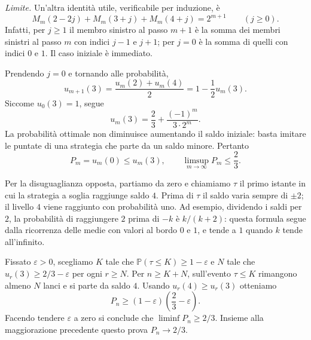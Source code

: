 {\emph{Limite.}
Un'altra identit\`a utile, verificabile per induzione, \`e
\[
 M_m(2-2j)+M_m(3+j)+M_m(4+j)=2^{m+1}
 \qquad(j\geq0).
\]
Infatti, per $j\geq1$ il membro sinistro al passo $m+1$ \`e la somma
dei membri sinistri al passo $m$ con indici $j-1$ e $j+1$;
per $j=0$ \`e la somma di quelli con indici $0$ e $1$.
Il caso iniziale \`e immediato.

Prendendo $j=0$ e tornando alle probabilit\`a,
\[
 u_{m+1}(3)=\frac{u_m(2)+u_m(4)}2
          =1-\frac12u_m(3).
\]
Siccome $u_0(3)=1$, segue
\[
 u_m(3)=\frac23+\frac{(-1)^m}{3\cdot2^m}.
\]
La probabilit\`a ottimale non diminuisce aumentando il saldo iniziale:
basta imitare le puntate di una strategia che parte da un saldo minore.
Pertanto
\[
 P_m=u_m(0)\leq u_m(3),
 \qquad \limsup_{m\to\infty}P_m\leq\frac23.
\]

Per la disuguaglianza opposta, partiamo da zero e chiamiamo $\tau$
il primo istante in cui la strategia a soglia raggiunge saldo $4$.
Prima di $\tau$ il saldo varia sempre di $\pm2$; il livello $4$ viene
raggiunto con probabilit\`a uno. Ad esempio, dividendo i saldi per $2$,
la probabilit\`a di raggiungere $2$ prima di $-k$ \`e $k/(k+2)$:
questa formula segue dalla ricorrenza delle medie con valori al bordo
$0$ e $1$, e tende a $1$ quando $k$ tende all'infinito.

Fissato $\varepsilon>0$, scegliamo $K$ tale che
$\mathbb P(\tau\leq K)\geq1-\varepsilon$ e $N$ tale che
$u_r(3)\geq2/3-\varepsilon$ per ogni $r\geq N$.
Per $n\geq K+N$, sull'evento $\tau\leq K$ rimangono almeno $N$ lanci
e si parte da saldo $4$. Usando $u_r(4)\geq u_r(3)$ otteniamo
\[
 P_n\geq(1-\varepsilon)\left(\frac23-\varepsilon\right).
\]
Facendo tendere $\varepsilon$ a zero si conclude che
$\liminf P_n\geq2/3$. Insieme alla maggiorazione precedente questo
prova $P_n\to2/3$.
}
\renewcommand{\SoluzioniAlternative}{}
\renewcommand{\Osservazioni}{}
\renewcommand{\Commenti}{}
